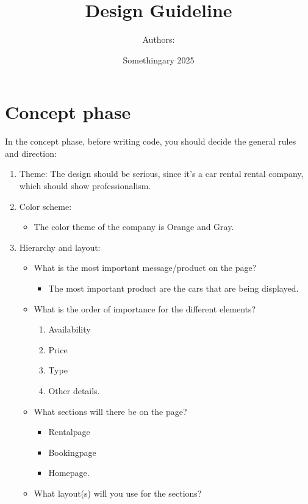 \documentclass{article}
\title{Design Guideline}
\author{Authors: }
\date{Somethingary 2025}
\begin{document}
\maketitle

\newpage
\section{Concept phase}
In the concept phase, before writing code, you should decide the general rules and direction:
\begin{enumerate}
    \item Theme: The design should be serious, since it's a car rental rental company, which should show professionalism.
    \item Color scheme:
    \begin{itemize}
        \item The color theme of the company is Orange and Gray.
    \end{itemize}
    \item Hierarchy and layout:
    \begin{itemize}
        \item What is the most important message/product on the page?
        \begin{itemize}
            \item The most important product are the cars that are being displayed.
        \end{itemize}
        \item What is the order of importance for the different elements?
        \begin{enumerate}
            \item Availability
            \item Price
            \item Type
            \item Other details.
        \end{enumerate}
        \item What sections will there be on the page?
        \begin{itemize}
            \item Rentalpage
            \item Bookingpage
            \item Homepage.
        \end{itemize}
        \item What layout(s) will you use for the sections?
        \begin{itemize}

\end{itemize}
\end{itemize}
\end{enumerate}
\end{document}
